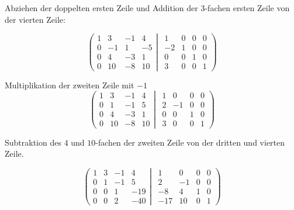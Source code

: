 \documentclass[a4paper,german,12pt,smallheadings]{scrartcl}
\begin{document}
Abziehen der doppelten ersten Zeile und Addition der $3$-fachen ersten Zeile von der vierten Zeile:

\begin{equation*}
\left(
 \begin{matrix}
 1 & 3 & -1 & 4 \\
 0 & -1 & 1 & -5 \\
 0 & 4 & -3 & 1 \\
 0 & 10 & -8 & 10
 \end{matrix}
 \left|
  \hspace{5pt}
  \begin{matrix}
  1 & 0 & 0 & 0 \\
  -2 & 1 & 0 & 0 \\
  0 & 0 & 1 & 0 \\
  3 & 0 & 0 & 1
  \end{matrix}
 \right)
\right.
\end{equation*}

Multiplikation der zweiten Zeile mit $-1$
\begin{equation*}
\left(
 \begin{matrix}
 1 & 3 & -1 & 4 \\
 0 & 1 & -1 & 5 \\
 0 & 4 & -3 & 1 \\
 0 & 10 & -8 & 10
 \end{matrix}
 \left|
  \hspace{5pt}
  \begin{matrix}
  1 & 0 & 0 & 0 \\
  2 & -1 & 0 & 0 \\
  0 & 0 & 1 & 0 \\
  3 & 0 & 0 & 1
  \end{matrix}
 \right)
\right.
\end{equation*}

Subtraktion des $4$ und $10$-fachen der zweiten Zeile von der dritten und vierten Zeile.

\begin{equation*}
\left(
 \begin{matrix}
 1 & 3 & -1 & 4 \\
 0 & 1 & -1 & 5 \\
 0 & 0 & 1 & -19 \\
 0 & 0 & 2 & -40
 \end{matrix}
 \left|
  \hspace{5pt}
  \begin{matrix}
  1 & 0 & 0 & 0 \\
  2 & -1 & 0 & 0 \\
  -8 & 4 & 1 & 0 \\
  -17 & 10 & 0 & 1
  \end{matrix}
 \right)
\right.
\end{equation*}
\end{document}
